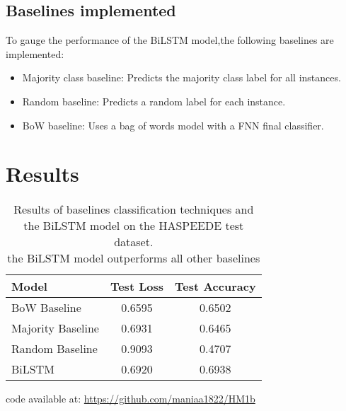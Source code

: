 \documentclass[11pt,a4paper]{article}
\begin{document}
\subsection{Baselines implemented}
To gauge the performance of the BiLSTM model,the following baselines are implemented:
\begin{itemize}
    \item Majority class baseline: Predicts the majority class label for all instances.
    \item Random baseline: Predicts a random label for each instance.
    \item BoW baseline: Uses a bag of words model with a FNN final classifier.
\end{itemize}
\section{Results}
\begin{table}[h!]
\centering
\begin{tabular}{|l|c|c|}
\hline
\textbf{Model} & \textbf{Test Loss} & \textbf{Test Accuracy} \\
\hline
BoW Baseline & 0.6595 & 0.6502 \\
\hline
Majority Baseline & 0.6931 & 0.6465 \\
\hline
Random Baseline & 0.9093 & 0.4707 \\
\hline
BiLSTM & 0.6920 & 0.6938 \\
\hline
\end{tabular}
\caption{Results of baselines classification techniques and the BiLSTM model on the HASPEEDE test dataset.\\the BiLSTM model outperforms all other baselines}
\label{tab:results}
\end{table}



code available at: \url{https://github.com/maniaa1822/HM1b}
\end{document}
